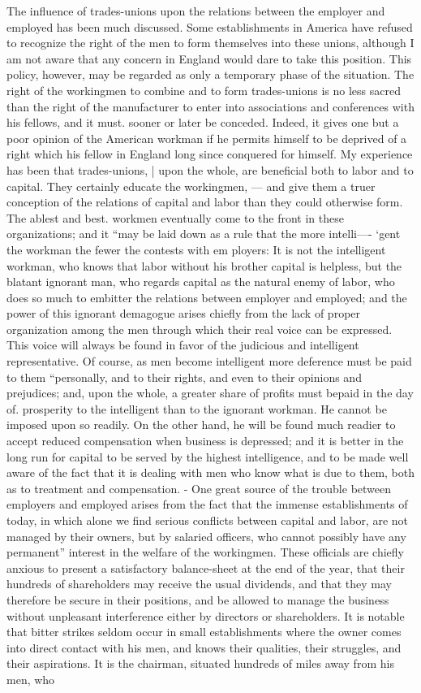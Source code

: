 \documentclass[11pt,openany]{book}
\begin{document}
The influence of trades-unions upon the relations between the employer and employed has been much discussed. Some establishments in America have refused to recognize the right of the men to form themselves into these unions, although I am not aware that any concern in England would dare to take this position. This policy, however, may be regarded as only a temporary phase of the situation. The right of the workingmen to combine and to form trades-unions is no less sacred than the right of the manufacturer to enter into associations and conferences with his fellows, and it must. sooner or later be conceded. Indeed, it gives one but a poor opinion of the American workman if he permits himself to be deprived of a right which his fellow in England long since conquered for himself. My experience has been that trades-unions, | upon the whole, are beneficial both to labor and to capital. They certainly educate the workingmen, --- and give them a truer conception of the relations of capital and labor than they could otherwise form. The ablest and best. workmen eventually come to the front in these organizations; and it  ``may be laid down as a rule that the more intelli---- `gent the workman the fewer the contests with em ployers: It is not the intelligent workman, who knows that labor without his brother capital is helpless, but the blatant ignorant man, who regards capital as the natural enemy of labor, who does so much to embitter the relations between employer and employed; and the power of this ignorant demagogue arises chiefly from the lack of proper organization among the men through which their real voice can be expressed. This voice will always be found in favor of the judicious and intelligent representative. Of course, as men become intelligent more deference must be paid to them ``personally, and to their rights, and even to their opinions and prejudices; and, upon the whole, a greater share of profits must bepaid in the day of. prosperity to the intelligent than to the ignorant workman. He cannot be imposed upon so readily. On the other hand, he will be found much readier to accept reduced compensation when business is depressed; and it is better in the long run for capital to be served by the highest intelligence, and to be made well aware of the fact that it is dealing with men who know what is due to them, both as to treatment and compensation. - One great source of the trouble between employers and employed arises from the fact that the immense establishments of today, in which alone we find serious conflicts between capital and labor, are not managed by their owners, but by salaried officers, who cannot possibly have any permanent'' interest in the welfare of the workingmen. These officials are chiefly anxious to present a satisfactory balance-sheet at the end of the year, that their hundreds of shareholders may receive the usual dividends, and that they may therefore be secure in their positions, and be allowed to manage the business without unpleasant interference either by directors or shareholders. It is notable that bitter strikes seldom occur in small establishments where the owner comes into direct contact with his men, and knows their qualities, their struggles, and their aspirations. It is the chairman, situated hundreds of miles away from his men, who 
\end{document}
